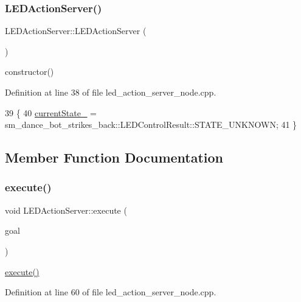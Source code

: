 \subsubsection{\texorpdfstring{L\+E\+D\+Action\+Server()}{LEDActionServer()}\hspace{0.1cm}{\footnotesize\ttfamily [3/3]}}
{\footnotesize\ttfamily L\+E\+D\+Action\+Server\+::\+L\+E\+D\+Action\+Server (\begin{DoxyParamCaption}{ }\end{DoxyParamCaption})\hspace{0.3cm}{\ttfamily [inline]}}

constructor() 

Definition at line 38 of file led\+\_\+action\+\_\+server\+\_\+node.\+cpp.


\begin{DoxyCode}
39   \{
40     \hyperlink{classLEDActionServer_a1dc456e987dc331501ad6ff2215661ff}{currentState\_} =  sm\_dance\_bot\_strikes\_back::LEDControlResult::STATE\_UNKNOWN;
41   \}
\end{DoxyCode}


\subsection{Member Function Documentation}
\mbox{\label{classLEDActionServer_a2d8b9dfca1912e24170ef69a5edf5e9b}} 
\subsubsection{\texorpdfstring{execute()}{execute()}\hspace{0.1cm}{\footnotesize\ttfamily [1/3]}}
{\footnotesize\ttfamily void L\+E\+D\+Action\+Server\+::execute (\begin{DoxyParamCaption}\item[{const sm\+\_\+dance\+\_\+bot\+::\+L\+E\+D\+Control\+Goal\+Const\+Ptr \&}]{goal }\end{DoxyParamCaption})\hspace{0.3cm}{\ttfamily [inline]}}

\hyperlink{classLEDActionServer_a2d8b9dfca1912e24170ef69a5edf5e9b}{execute()} 

Definition at line 60 of file led\+\_\+action\+\_\+server\+\_\+node.\+cpp.



